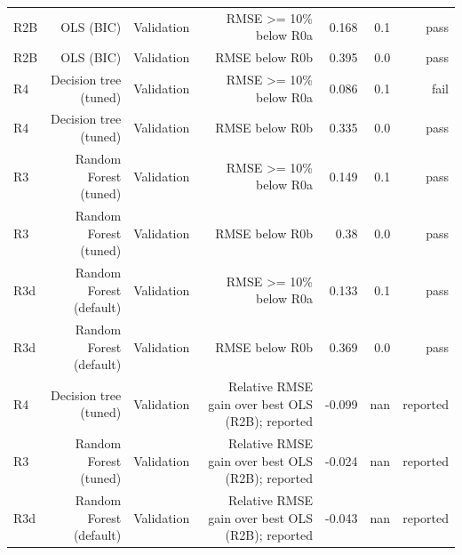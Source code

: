 \begin{table}[htbp]
\begin{tabular}{lrrrrrr}
R2B & OLS (BIC) & Validation & RMSE >= 10\% below R0a & 0.168 & 0.1 & pass \\
R2B & OLS (BIC) & Validation & RMSE below R0b & 0.395 & 0.0 & pass \\
R4 & Decision tree (tuned) & Validation & RMSE >= 10\% below R0a & 0.086 & 0.1 & fail \\
R4 & Decision tree (tuned) & Validation & RMSE below R0b & 0.335 & 0.0 & pass \\
R3 & Random Forest (tuned) & Validation & RMSE >= 10\% below R0a & 0.149 & 0.1 & pass \\
R3 & Random Forest (tuned) & Validation & RMSE below R0b & 0.38 & 0.0 & pass \\
R3d & Random Forest (default) & Validation & RMSE >= 10\% below R0a & 0.133 & 0.1 & pass \\
R3d & Random Forest (default) & Validation & RMSE below R0b & 0.369 & 0.0 & pass \\
R4 & Decision tree (tuned) & Validation & Relative RMSE gain over best OLS (R2B); reported & -0.099 & nan & reported \\
R3 & Random Forest (tuned) & Validation & Relative RMSE gain over best OLS (R2B); reported & -0.024 & nan & reported \\
R3d & Random Forest (default) & Validation & Relative RMSE gain over best OLS (R2B); reported & -0.043 & nan & reported \\
\bottomrule
\end{tabular}
\par\smallskip\begin{minipage}{\linewidth}\footnotesize \end{minipage}
\end{table}

